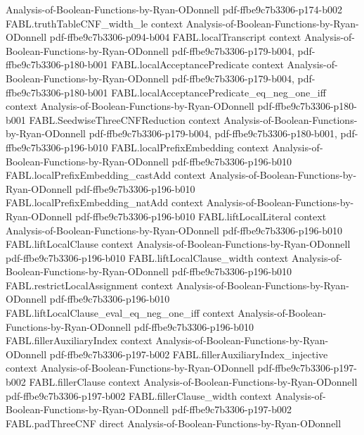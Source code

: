 \begin{theorem}
  {Analysis-of-Boolean-Functions-by-Ryan-ODonnell}
  {pdf-ffbe9c7b3306-p174-b002}
\proofstep
  {FABL.truthTableCNF_width_le}
  {context}
  {Analysis-of-Boolean-Functions-by-Ryan-ODonnell}
  {pdf-ffbe9c7b3306-p094-b004}
\proofstep
  {FABL.localTranscript}
  {context}
  {Analysis-of-Boolean-Functions-by-Ryan-ODonnell}
  {pdf-ffbe9c7b3306-p179-b004,
    pdf-ffbe9c7b3306-p180-b001}
\proofstep
  {FABL.localAcceptancePredicate}
  {context}
  {Analysis-of-Boolean-Functions-by-Ryan-ODonnell}
  {pdf-ffbe9c7b3306-p179-b004,
    pdf-ffbe9c7b3306-p180-b001}
\proofstep
  {FABL.localAcceptancePredicate_eq_neg_one_iff}
  {context}
  {Analysis-of-Boolean-Functions-by-Ryan-ODonnell}
  {pdf-ffbe9c7b3306-p180-b001}
\proofstep
  {FABL.SeedwiseThreeCNFReduction}
  {context}
  {Analysis-of-Boolean-Functions-by-Ryan-ODonnell}
  {pdf-ffbe9c7b3306-p179-b004,
    pdf-ffbe9c7b3306-p180-b001,
    pdf-ffbe9c7b3306-p196-b010}
\proofstep
  {FABL.localPrefixEmbedding}
  {context}
  {Analysis-of-Boolean-Functions-by-Ryan-ODonnell}
  {pdf-ffbe9c7b3306-p196-b010}
\proofstep
  {FABL.localPrefixEmbedding_castAdd}
  {context}
  {Analysis-of-Boolean-Functions-by-Ryan-ODonnell}
  {pdf-ffbe9c7b3306-p196-b010}
\proofstep
  {FABL.localPrefixEmbedding_natAdd}
  {context}
  {Analysis-of-Boolean-Functions-by-Ryan-ODonnell}
  {pdf-ffbe9c7b3306-p196-b010}
\proofstep
  {FABL.liftLocalLiteral}
  {context}
  {Analysis-of-Boolean-Functions-by-Ryan-ODonnell}
  {pdf-ffbe9c7b3306-p196-b010}
\proofstep
  {FABL.liftLocalClause}
  {context}
  {Analysis-of-Boolean-Functions-by-Ryan-ODonnell}
  {pdf-ffbe9c7b3306-p196-b010}
\proofstep
  {FABL.liftLocalClause_width}
  {context}
  {Analysis-of-Boolean-Functions-by-Ryan-ODonnell}
  {pdf-ffbe9c7b3306-p196-b010}
\proofstep
  {FABL.restrictLocalAssignment}
  {context}
  {Analysis-of-Boolean-Functions-by-Ryan-ODonnell}
  {pdf-ffbe9c7b3306-p196-b010}
\proofstep
  {FABL.liftLocalClause_eval_eq_neg_one_iff}
  {context}
  {Analysis-of-Boolean-Functions-by-Ryan-ODonnell}
  {pdf-ffbe9c7b3306-p196-b010}
\proofstep
  {FABL.fillerAuxiliaryIndex}
  {context}
  {Analysis-of-Boolean-Functions-by-Ryan-ODonnell}
  {pdf-ffbe9c7b3306-p197-b002}
\proofstep
  {FABL.fillerAuxiliaryIndex_injective}
  {context}
  {Analysis-of-Boolean-Functions-by-Ryan-ODonnell}
  {pdf-ffbe9c7b3306-p197-b002}
\proofstep
  {FABL.fillerClause}
  {context}
  {Analysis-of-Boolean-Functions-by-Ryan-ODonnell}
  {pdf-ffbe9c7b3306-p197-b002}
\proofstep
  {FABL.fillerClause_width}
  {context}
  {Analysis-of-Boolean-Functions-by-Ryan-ODonnell}
  {pdf-ffbe9c7b3306-p197-b002}
\proofstep
  {FABL.padThreeCNF}
  {direct}
  {Analysis-of-Boolean-Functions-by-Ryan-ODonnell}

\end{theorem}
